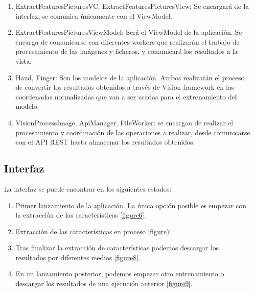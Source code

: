 \documentclass[../main.tex]{subfiles}
\begin{document}
\begin{enumerate}
    \item ExtractFeaturesPicturesVC, ExtractFeaturesPicturesView: Se encargará de la interfaz, se comunica únicamente con el ViewModel.
    \item ExtractFeaturesPicturesViewModel: Será el ViewModel de la aplicación. Se encarga de comunicarse con diferentes workers que realizarán el trabajo de procesamiento de las imágenes y ficheros, y comunicará los resultados a la vista.
    \item Hand, Finger: Son los modelos de la aplicación. Ambos realizarán el proceso de convertir los resultados obtenidos a través de Vision framework en las coordenadas normalizadas que van a ser usadas para el entrenamiento del modelo. 
    \item VisionProcessImage, ApiManager, FileWorker: se encargan de realizar el procesamiento y coordinación de las operaciones a realizar, desde comunicarse con el API REST hasta almacenar los resultados obtenidos. 
\end{enumerate}

\subsection{Interfaz}

La interfaz se puede encontrar en los siguientes estados:

\begin{enumerate}
    \item Primer lanzamiento de la aplicación. La única opción posible es empezar con la extracción de las características \ref{figure6}.
    \item Extracción de las características en proceso \ref{figure7}.
    \item Tras finalizar la extracción de características podemos descargar los resultados por diferentes medios \ref{figure8}.
    \item En un lanzamiento posterior, podemos empezar otro entrenamiento o descargar los resultados de una ejecución anterior \ref{figure9}.
\end{enumerate}
\end{document}
